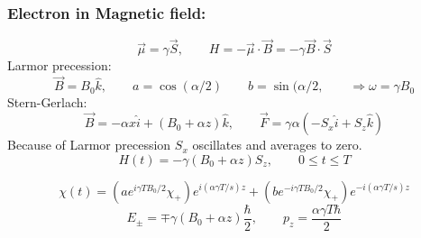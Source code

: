 \documentclass[a4paper,norsk, 10pt]{article}
\begin{document}
\subsubsection{Electron in Magnetic field:}
\begin{equation}
\vec{\mu} = \gamma \vec{S},\qquad H = - \vec{\mu}\cdot\vec{B} = - \gamma\vec{B}\cdot\vec{S}
\end{equation}
Larmor precession:
\begin{equation}
\vec{B} = B_0\hat{k}, \qquad a = \cos(\alpha/2)\qquad b = \sin(\alpha/2, \qquad \Rightarrow \omega = \gamma B_0
\end{equation}
Stern-Gerlach:
\begin{equation}
\vec{B} = -\alpha x\hat{i} + (B_0 + \alpha z)\hat{k}, \qquad \vec{F} = \gamma\alpha(-S_x\hat{i} + S_z\hat{k}) 
\end{equation}
Because of Larmor precession $S_x$ oscillates and averages to zero.
\begin{equation}
H(t) = -\gamma(B_0 + \alpha z)S_z, \qquad 0\leq t \leq T
\end{equation}

\begin{equation}
\chi(t) = (ae^{i\gamma T B_0/2}\chi_+)e^{i(\alpha \gamma T/s)z} + (be^{-i\gamma T B_0/2}\chi_+)e^{-i(\alpha \gamma T/s)z}
\end{equation}
\begin{equation}
E_{\pm} = \mp \gamma(B_0 + \alpha z)\frac{\hbar}{2}, \qquad p_z = \frac{\alpha \gamma T \hbar}{2}
\end{equation}
\end{document}
